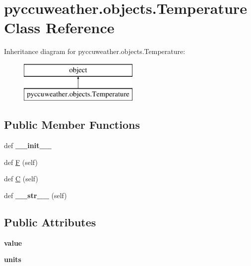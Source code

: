 \hypertarget{classpyccuweather_1_1objects_1_1_temperature}{}\section{pyccuweather.\+objects.\+Temperature Class Reference}
\label{classpyccuweather_1_1objects_1_1_temperature}
Inheritance diagram for pyccuweather.\+objects.\+Temperature\+:\begin{figure}[H]
\begin{center}
\leavevmode
\includegraphics[height=2.000000cm]{classpyccuweather_1_1objects_1_1_temperature}
\end{center}
\end{figure}
\subsection*{Public Member Functions}
\begin{DoxyCompactItemize}
\item 
\hypertarget{classpyccuweather_1_1objects_1_1_temperature_a0b6c5c7abaa9244806b7fa16b3d4e9f3}{}def {\bfseries \+\_\+\+\_\+init\+\_\+\+\_\+}\label{classpyccuweather_1_1objects_1_1_temperature_a0b6c5c7abaa9244806b7fa16b3d4e9f3}

\item 
def \hyperlink{classpyccuweather_1_1objects_1_1_temperature_a6331f9e12224775c19c27eec5f26a3c7}{F} (self)
\item 
def \hyperlink{classpyccuweather_1_1objects_1_1_temperature_a4b1adae2885e87eceff3127af1b46a3c}{C} (self)
\item 
\hypertarget{classpyccuweather_1_1objects_1_1_temperature_a1ec2241a99c0030a9a70199e6b2da037}{}def {\bfseries \+\_\+\+\_\+str\+\_\+\+\_\+} (self)\label{classpyccuweather_1_1objects_1_1_temperature_a1ec2241a99c0030a9a70199e6b2da037}

\end{DoxyCompactItemize}
\subsection*{Public Attributes}
\begin{DoxyCompactItemize}
\item 
\hypertarget{classpyccuweather_1_1objects_1_1_temperature_ac54036fc8d9d545dc8c153dec17eeacb}{}{\bfseries value}\label{classpyccuweather_1_1objects_1_1_temperature_ac54036fc8d9d545dc8c153dec17eeacb}

\item 
\hypertarget{classpyccuweather_1_1objects_1_1_temperature_ac6cd3e7f652318fc3b3c84ffec313756}{}{\bfseries units}\label{classpyccuweather_1_1objects_1_1_temperature_ac6cd3e7f652318fc3b3c84ffec313756}

\end{DoxyCompactItemize}


